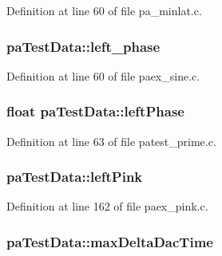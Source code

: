 Definition at line 60 of file pa\+\_\+minlat.\+c.

\subsubsection[{\texorpdfstring{left\+\_\+phase}{left_phase}}]{ pa\+Test\+Data\+::left\+\_\+phase}\hypertarget{structpa_test_data_a7395cffc18c4a1734f7e857f21ca1a9b}{}\label{structpa_test_data_a7395cffc18c4a1734f7e857f21ca1a9b}


Definition at line 60 of file paex\+\_\+sine.\+c.

\subsubsection[{\texorpdfstring{left\+Phase}{leftPhase}}]{\setlength{\rightskip}{0pt plus 5cm}float pa\+Test\+Data\+::left\+Phase}\hypertarget{structpa_test_data_a791399a61d1c91f168215407fc8f2ec1}{}\label{structpa_test_data_a791399a61d1c91f168215407fc8f2ec1}


Definition at line 63 of file patest\+\_\+prime.\+c.

\subsubsection[{\texorpdfstring{left\+Pink}{leftPink}}]{ pa\+Test\+Data\+::left\+Pink}\hypertarget{structpa_test_data_a276b5eed3dc2e5b1fd8728a81c9f005a}{}\label{structpa_test_data_a276b5eed3dc2e5b1fd8728a81c9f005a}


Definition at line 162 of file paex\+\_\+pink.\+c.

\subsubsection[{\texorpdfstring{max\+Delta\+Dac\+Time}{maxDeltaDacTime}}]{ pa\+Test\+Data\+::max\+Delta\+Dac\+Time}\hypertarget{structpa_test_data_a9a96e58f6fd9e5b201ae2aa3fd74980e}{}\label{structpa_test_data_a9a96e58f6fd9e5b201ae2aa3fd74980e}


